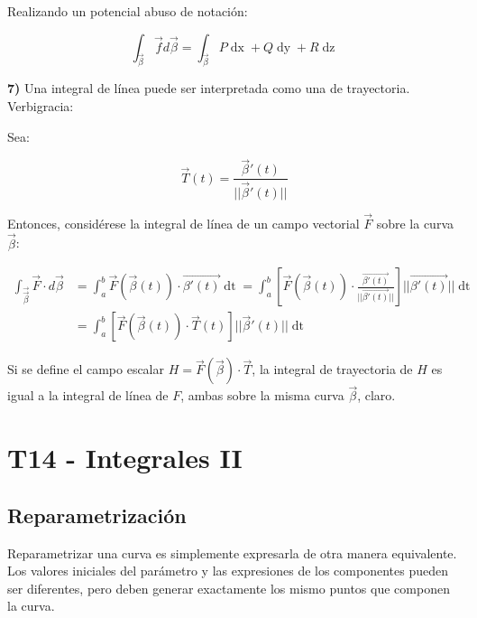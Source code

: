 \documentclass{article}
\begin{document}
Realizando un potencial abuso de notación:

\begin{equation}
\int_{\overrightarrow{\beta}} \overrightarrow{f} d\overrightarrow{\beta} = \int_{\overrightarrow{\beta}} P \mathop{dx} + Q \mathop{dy} + R \mathop{dz}
\end{equation}

\textbf{7)} Una integral de línea puede ser interpretada como una de trayectoria. Verbigracia:

Sea:

\begin{equation}
\overrightarrow{T}(t) = \frac{ \overrightarrow{\beta}'(t) }{||\overrightarrow{\beta}'(t)||}
\end{equation}

Entonces, considérese la integral de línea de un campo vectorial $\overrightarrow{F}$ sobre la curva $\overrightarrow{\beta}$:

\begin{align}
\int_{\overrightarrow{\overrightarrow{\beta}}} \overrightarrow{F} \cdot d\overrightarrow{\beta} &= \int_{a}^b \overrightarrow{F}(\overrightarrow{\beta}(t)) \cdot \overrightarrow{\beta'(t)} \mathop{dt} = \int_{a}^b \left[ \overrightarrow{F}(\overrightarrow{\beta}(t)) \cdot \frac{ \overrightarrow{\beta'(t)} }{||\overrightarrow{\beta'(t)}||} \right] ||\overrightarrow{\beta'(t)}|| \mathop{dt} \\
&= \int_{a}^b \left[ \overrightarrow{F}(\overrightarrow{\beta}(t)) \cdot \overrightarrow{T}(t) \right] ||\overrightarrow{\beta}'(t)|| \mathop{dt}
\end{align}

Si se define el campo escalar $H = \overrightarrow{F}(\overrightarrow{\beta}) \cdot \overrightarrow{T}$, la integral de trayectoria de $H$ es igual a la integral de línea de $F$, ambas sobre la misma curva $\overrightarrow{\beta}$, claro.

\section{T14 - Integrales II}

\subsection{Reparametrización}

Reparametrizar una curva es simplemente expresarla de otra manera equivalente. Los valores iniciales del parámetro y las expresiones de los componentes pueden ser diferentes, pero deben generar exactamente los mismo puntos que componen la curva.
\end{document}
